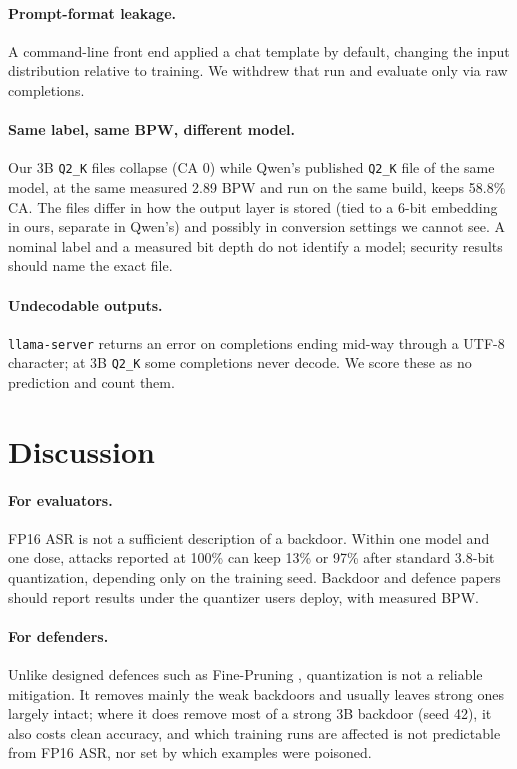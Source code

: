 \documentclass[11pt]{article}
\newcommand{\qtwo}{\texttt{Q2\_K}}
\begin{document}
\paragraph{Prompt-format leakage.} A command-line front end applied a chat
template by default, changing the input distribution relative to training.
We withdrew that run and evaluate only via raw completions.

\paragraph{Same label, same BPW, different model.} Our 3B \qtwo{} files
collapse (CA 0) while Qwen's published \qtwo{} file of the same model, at the
same measured 2.89 BPW and run on the same build, keeps 58.8\% CA. The files
differ in how the output layer is stored (tied to a 6-bit embedding in ours,
separate in Qwen's) and possibly in conversion settings we cannot see. A
nominal label and a measured bit depth do not identify a model; security
results should name the exact file.

\paragraph{Undecodable outputs.} \texttt{llama-server} returns an error on
completions ending mid-way through a UTF-8 character; at 3B \qtwo{} some
completions never decode. We score these as no prediction and count them.

\section{Discussion}

\paragraph{For evaluators.} FP16 ASR is not a sufficient description of a
backdoor. Within one model and one dose, attacks reported at 100\% can keep
13\% or 97\% after standard 3.8-bit quantization, depending only on the
training seed. Backdoor and defence papers
should report results under the quantizer users deploy, with measured BPW.

\paragraph{For defenders.} Unlike designed defences such as Fine-Pruning
\citep{liu2018finepruning}, quantization is not a reliable mitigation. It removes mainly the weak
backdoors and usually leaves strong ones largely intact; where it does remove
most of a strong 3B backdoor (seed 42), it also costs clean accuracy, and
which training runs are affected is not predictable from FP16 ASR, nor set by
which examples were poisoned.
\end{document}
